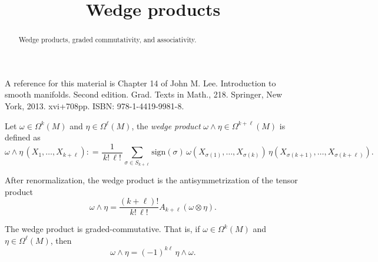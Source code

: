 \documentclass{ximera}
\title{Wedge products}
\begin{document}
    \begin{abstract} Wedge products, graded commutativity, and associativity. \end{abstract}
    \maketitle

    A reference for this material is Chapter 14 of John M. Lee. Introduction to smooth manifolds. Second edition. Grad. Texts in Math., 218. Springer, New York, 2013. xvi+708pp. ISBN: 978-1-4419-9981-8.

    \begin{definition}
        Let $\omega \in \Omega ^k (M) $ and $\eta \in \Omega ^{\ell} (M)$, the \emph{wedge product} $\omega \wedge \eta \in \Omega ^{k + \ell } (M)$ is defined as
        \[     \omega \wedge \eta \, (X_1 , \ldots , X_{k + \ell} )  : = \frac{1}{\, k! \, \ell ! \, } \sum _{\sigma \in S_{k + \ell}} \text{sign}(\sigma)\, \omega (  X_{\sigma (1) }  , \ldots , X_{\sigma (k)})\,  \eta (  X_{\sigma (k+1)} , \ldots , X_{\sigma (k + \ell )}).                \]
    \end{definition}

    After renormalization, the wedge product is the antisymmetrization of the tensor product
        \[     \omega \wedge \eta = \frac{(k + \ell ) !}{k!\,  \ell ! } A_{k + \ell } (\omega \otimes \eta ) .                      \]
    \begin{proposition}
        The wedge product is graded-commutative. That is, if $\omega \in \Omega ^k (M) $ and $\eta \in \Omega ^{\ell} (M)$, then
        \[   \omega \wedge \eta =  (-1) ^{k\ell} \, \eta \wedge \omega .           \]
    \end{proposition}
\end{document}
